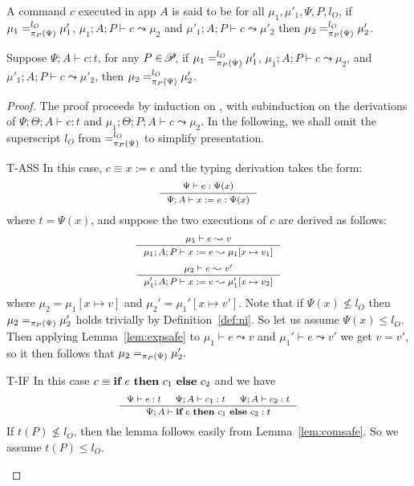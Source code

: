 {{{%


\begin{definition}\label{def:ni}
A command $c$ executed in app $A$ is said to be {} 
for all $\mu_1, \mu'_1,\Psi, P, l_{O}$,
if  $\mu_1 =_{\pi_{{P}}({\Psi})}^{l_{O}} \mu'_1$, \; $\mu_1;A ; P\vdash c \leadsto \mu_2 $ and
 $\mu'_1; A; P\vdash c\leadsto \mu'_2  $
then $\mu_2 =_{\pi_{{P}}({\Psi})}^{l_{O}} \mu'_2$.
\end{definition}


\begin{lemma}\label{lem:comni}
Suppose $\Psi; A\vdash c : t$, for any $P\in\!\mathscr{P}\!$, if  $\mu_1 =_{\pi_{{P}}({\Psi})}^{l_{O}} \mu'_1$, $\mu_1; A; P \vdash c \leadsto \mu_2$,
and  $\mu'_1; A; P \vdash c \leadsto \mu'_2$,
then  $\mu_2 =_{\pi_{{P}}({\Psi})}^{l_{O}} \mu'_2$.
\end{lemma}
\begin{proof}
The proof proceeds by induction on , with subinduction
on the derivations of $\Psi;\Theta;A \vdash c : t$ and $\mu_1;\Theta;P;A\vdash c \leadsto \mu_2$.
In the following, we shall omit the superscript $l_O$ from
$=^{l_O}_{\pi_{{P}}({\Psi})}$ to simplify presentation.

\begin{ProofEnumDesc}
\item[T-ASS] In this case, $c \equiv x := e$ and the typing derivation takes the form:
$$\myeqsize
\inference
{\Psi \vdash e : \Psi(x)}
{\Psi ; A \vdash \lcASS{x}{e} : \Psi(x)}
$$
where $t = \Psi(x)$, and suppose the two executions
of $c$ are derived as follows:
$$\myeqsize
\inference{\mu_1 \vdash e \leadsto v}
{\mu_1; A; P \vdash \lcASS{x}{e} \leadsto \mu_1 [ x \mapsto v_1 ]}
$$
$$\myeqsize
\inference{\mu_2 \vdash e \leadsto v'}
{\mu_1'; A; P \vdash \lcASS{x}{e} \leadsto \mu_1' [ x \mapsto v_2 ]}
$$
where $\mu_2 = \mu_1[x \mapsto v]$
and $\mu_2' = \mu_1'[x \mapsto v'].$
Note that if $\Psi(x) \not \leq l_O$ then
$\mu_2 =_{\pi_{{P}}({\Psi})} \mu_2'$ holds trivially
by Definition~\ref{def:ni}.
So let us assume $\Psi(x) \leq l_O$. Then applying Lemma~\ref{lem:expsafe}
to
$\mu_1 \vdash e \leadsto v$
and $\mu_1' \vdash e \leadsto v'$
we get
$v = v'$, so it then follows that  $\mu_2 =_{\pi_{{P}}({\Psi})} \mu_2'.$
\item[T-IF] In this case $c \equiv {\textbf{if}~{e}~\textbf{then}~{c_1}~\textbf{else}~{c_2}}$ and we have
$$\myeqsize
\inference
{\Psi \vdash e : t & \Psi ; A\vdash c_1 : t & \Psi; A \vdash c_2 : t }
{\Psi; A \vdash \lcIF{e}{c_1}{c_2} : t}
$$
If $t(P)\not\leq l_{O}$, then the lemma follows easily from
Lemma~\ref{lem:comsafe}. So we assume $t(P) \leq l_O.$


\end{ProofEnumDesc}
\end{proof}}}}

